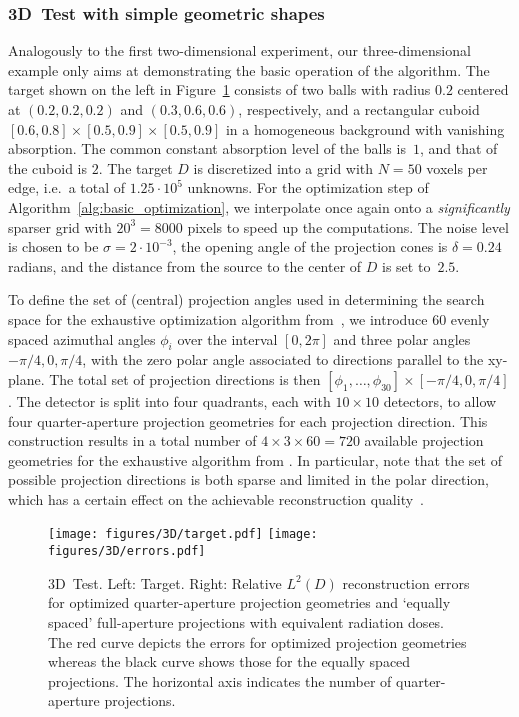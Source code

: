 \documentclass[final]{siamltex}
\begin{document}
\subsubsection{3D~Test with simple geometric shapes}
Analogously to the first two-dimensional experiment, our three-dimensional example only aims at demonstrating the basic operation of the algorithm. The target shown on the left in Figure~\ref{fig:3Dtest1} consists of two balls with radius $0.2$ centered at $(0.2,0.2,0.2)$ and $(0.3,0.6,0.6)$, respectively, and a rectangular cuboid $[0.6, 0.8] \times [0.5,0.9] \times [0.5,0.9]$ in a homogeneous background with vanishing absorption.
The common constant absorption level of the balls is~$1$, and that of the cuboid is $2$. The target $D$ is discretized into a grid with $N=50$ voxels per edge, i.e.~a total of $1.25\cdot 10^5$ unknowns. For the optimization step of Algorithm~\ref{alg:basic_optimization}, we interpolate once again onto a {\em significantly} sparser grid with $20^3 = 8000$ pixels to speed up the computations. The noise level is chosen to be $\sigma = 2 \cdot 10^{-3}$, the opening angle of the projection cones is $\delta = 0.24$ radians, and the distance from the source to the center of $D$ is set to~$2.5$.

To define the set of (central) projection angles used in determining the search space for the exhaustive optimization algorithm from~\cite{Burger21}, we introduce $60$ evenly spaced azimuthal angles $\phi_i$ over the interval $[0, 2 \pi]$ and three polar angles $-\pi/4, 0, \pi/4$, with the zero polar angle associated to directions parallel to the xy-plane. The total set of projection directions is then $[\phi_1, \ldots,\phi_{30}] \times [-\pi/4, 0, \pi/4]$. The detector is split into four quadrants, each with $10 \times 10$ detectors, to allow four quarter-aperture projection geometries for each projection direction. This construction results in a total number of  $4 \times 3 \times 60 = 720$ available projection geometries for the exhaustive algorithm from \cite{Burger21}. In particular, note that the set of possible projection directions is both sparse and limited in the polar direction, which has a certain effect on the achievable reconstruction quality~\cite{Quinto93}.

\begin{figure}
 \centering
 \texttt{[image: figures/3D/target.pdf]}
 \texttt{[image: figures/3D/errors.pdf]}
 \caption{{\sc 3D~Test.} Left: Target. Right: Relative $L^2(D)$ reconstruction errors for optimized quarter-aperture projection geometries and `equally spaced' full-aperture projections with equivalent radiation doses. The red curve depicts the errors for optimized projection geometries whereas the black curve shows those for the equally spaced projections. The horizontal axis indicates the number of quarter-aperture projections.}
 \label{fig:3Dtest1}
\end{figure}
\end{document}
